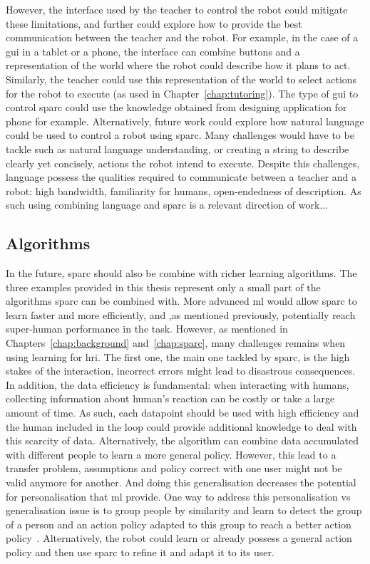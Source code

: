 However, the interface used by the teacher to control the robot could mitigate these limitations, and further could explore how to provide the best communication between the teacher and the robot. For example, in the case of a \gls{gui} in a tablet or a phone, the interface can combine buttons and a representation of the world where the robot could describe how it plans to act. Similarly, the teacher could use this representation of the world to select actions for the robot to execute (as used in Chapter~\ref{chap:tutoring}). The type of \gls{gui} to control \gls{sparc} could use the knowledge obtained from designing application for phone for example. Alternatively, future work could explore how natural language could be used to control a robot using \gls{sparc}. Many challenges would have to be tackle such as natural language understanding, or creating a string to describe clearly yet concisely, actions the robot intend to execute. Despite this challenges, language possess the qualities required to communicate between a teacher and a robot: high bandwidth, familiarity for humans, open-endedness of description. As such using combining language and \gls{sparc} is a relevant direction of work...

\subsection{Algorithms}

In the future, \gls{sparc} should also be combine with richer learning algorithms. The three examples provided in this thesis represent only a small part of the algorithms \gls{sparc} can be combined with. More advanced \gls{ml} would allow \gls{sparc} to learn faster and more efficiently, and ,as mentioned previously, potentially reach super-human performance in the task. However, as mentioned in Chapters~\ref{chap:background} and~\ref{chap:sparc}, many challenges remains when using learning for \gls{hri}. The first one, the main one tackled by \gls{sparc}, is the high stakes of the interaction, incorrect errors might lead to disastrous consequences. In addition, the data efficiency is fundamental: when interacting with humans, collecting information about human's reaction can be costly or take a large amount of time. As such, each datapoint should be used with high efficiency and the human included in the loop could provide additional knowledge to deal with this scarcity of data. Alternatively, the algorithm can combine data accumulated with different people to learn a more general policy. However, this lead to a transfer problem, assumptions and policy correct with one user might not be valid anymore for another. And doing this generalisation decreases the potential for personalisation that \gls{ml} provide. One way to address this personalisation vs generalisation issue is to group people by similarity and learn to detect the group of a person and an action policy adapted to this group to reach a better action policy~\citep{brunskill2014pac}. Alternatively, the robot could learn or already possess a general action policy and then use \gls{sparc} to refine it and adapt it to its user. 

